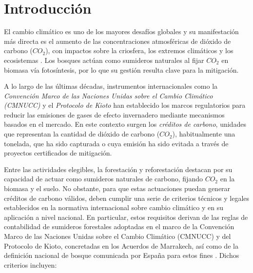 \section{Introducción}

El cambio climático es uno de los mayores desafíos globales y su manifestación más directa es el aumento de las concentraciones atmosféricas de dióxido de carbono (\(CO_2\)), con impactos sobre la criosfera, los extremos climáticos y los ecosistemas \cite{IPCC2007}. Los bosques actúan como sumideros naturales al fijar \(CO_2\) en biomasa vía fotosíntesis, por lo que su gestión resulta clave para la mitigación. 


A lo largo de las últimas décadas, instrumentos internacionales como la \textit{Convención Marco de las Naciones Unidas sobre el Cambio Climático (CMNUCC)} y el \textit{Protocolo de Kioto} \cite{UNFCCC1997,UNFCCC2015} han establecido los marcos regulatorios para reducir las emisiones de gases de efecto invernadero mediante mecanismos basados en el mercado. En este contexto surgen los \emph{créditos de carbono}, unidades que representan la cantidad de dióxido de carbono (\(CO_2\)), habitualmente una tonelada, que ha sido capturada o cuya emisión ha sido evitada a través de proyectos certificados de mitigación. 


Entre las actividades elegibles, la forestación y reforestación destacan por su capacidad de actuar como sumideros naturales de carbono, fijando \(CO_2\) en la biomasa y el suelo. No obstante, para que estas actuaciones puedan generar créditos de carbono válidos, deben cumplir una serie de criterios técnicos y legales establecidos en la normativa internacional sobre cambio climático y en su aplicación a nivel nacional. En particular, estos requisitos derivan de las reglas de contabilidad de sumideros forestales adoptadas en el marco de la Convención Marco de las Naciones Unidas sobre el Cambio Climático (CMNUCC) y del Protocolo de Kioto, concretadas en los Acuerdos de Marrakech, así como de la definición nacional de bosque comunicada por España para estos fines \cite{UNFCCCMarrakech,UNFCCCSpainReview}. Dichos criterios incluyen:

